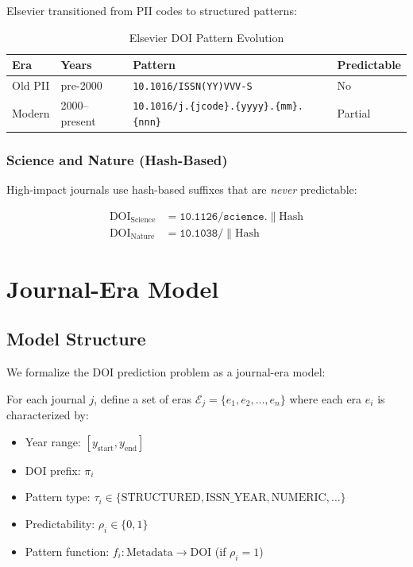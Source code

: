 Elsevier transitioned from PII codes to structured patterns:

\begin{table}[h]
\centering
\caption{Elsevier DOI Pattern Evolution}
\begin{tabular}{llll}
\toprule
\textbf{Era} & \textbf{Years} & \textbf{Pattern} & \textbf{Predictable} \\
\midrule
Old PII & pre-2000 & \texttt{10.1016/ISSN(YY)VVV-S} & No \\
Modern & 2000--present & \texttt{10.1016/j.\{jcode\}.\{yyyy\}.\{mm\}.\{nnn\}} & Partial \\
\bottomrule
\end{tabular}
\end{table}

\subsubsection{Science and Nature (Hash-Based)}

High-impact journals use hash-based suffixes that are \emph{never} predictable:

\begin{align}
\text{DOI}_{\text{Science}} &= \texttt{10.1126/science.} \| \text{Hash} \\
\text{DOI}_{\text{Nature}} &= \texttt{10.1038/} \| \text{Hash}
\end{align}

\section{Journal-Era Model}
\label{sec:journal-era-model}

\subsection{Model Structure}

We formalize the DOI prediction problem as a journal-era model:

\begin{definition}
For each journal $j$, define a set of eras $\mathcal{E}_j = \{e_1, e_2, \ldots, e_n\}$ where each era $e_i$ is characterized by:
\begin{itemize}
    \item Year range: $[y_{\text{start}}, y_{\text{end}}]$
    \item DOI prefix: $\pi_i$
    \item Pattern type: $\tau_i \in \{\text{STRUCTURED}, \text{ISSN\_YEAR}, \text{NUMERIC}, \ldots\}$
    \item Predictability: $\rho_i \in \{0, 1\}$
    \item Pattern function: $f_i: \text{Metadata} \to \text{DOI}$ (if $\rho_i = 1$)
\end{itemize}
\end{definition}

